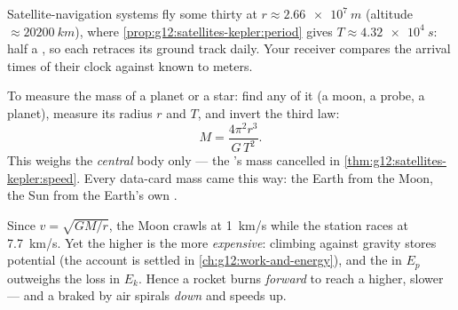 \begin{example}\label{ex:g12:satellites-kepler:gps}
Satellite-navigation systems fly some thirty  at
$r \approx \qty{2.66e7}{m}$ (altitude $\approx \qty{20200}{km}$),
where \cref{prop:g12:satellites-kepler:period} gives $T \approx
\qty{4.32e4}{s}$: half a , so each  retraces
its ground track daily. Your receiver compares the arrival times of
their clock  against  known to meters.
\end{example}

\begin{method}\label{met:g12:satellites-kepler:weigh}
%
To measure the mass of a planet or a star: find any  of it
(a moon, a probe, a planet), measure its  radius $r$ and 
$T$, and invert the third law:
\[ M = \frac{4\pi^2 r^3}{G\,T^2}. \]
This weighs the \emph{central} body only --- the 's mass
cancelled in \cref{thm:g12:satellites-kepler:speed}. Every data-card
mass came this way: the Earth from the Moon, the Sun from the
Earth's own .
\end{method}

\begin{remark}\label{rem:g12:satellites-kepler:energy}
Since $v = \sqrt{GM/r}$, the Moon crawls at \qty{1}{km/s} while the
station races at \qty{7.7}{km/s}. Yet the higher  is the more
\emph{expensive}: climbing against gravity stores potential 
(the account is settled in \cref{ch:g12:work-and-energy}), and the
 in $E_p$ outweighs the loss in $E_k$. Hence a rocket burns
\emph{forward} to reach a higher, slower  --- and a 
braked by  air spirals \emph{down} and speeds up.
\end{remark}


